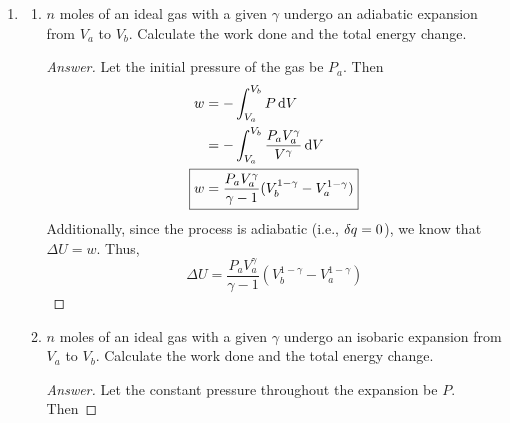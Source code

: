 \documentclass[../psets.tex]{subfiles}
\begin{document}
\begin{enumerate}
\begin{proof}[Answer]


    \end{proof}
    \item 
    \begin{enumerate}
        \item $n$ moles of an ideal gas with a given $\gamma$ undergo an adiabatic expansion from $V_a$ to $V_b$. Calculate the work done and the total energy change.
        \begin{proof}[Answer]
            Let the initial pressure of the gas be $P_a$. Then
            \begin{align*}
                w &= -\int_{V_a}^{V_b}P\dd{V}\\
                &= -\int_{V_a}^{V_b}\frac{P_aV_a^\gamma}{V^\gamma}\dd{V}\\
                \Aboxed{w &= \frac{P_aV_a^\gamma}{\gamma-1}(V_b^{1-\gamma}-V_a^{1-\gamma})}
            \end{align*}
            Additionally, since the process is adiabatic (i.e., $\var{q}=0$), we know that $\Delta U=w$. Thus,
            \begin{equation*}
                \boxed{\Delta U = \frac{P_aV_a^\gamma}{\gamma-1}(V_b^{1-\gamma}-V_a^{1-\gamma})}
            \end{equation*}
        \end{proof}
        \item $n$ moles of an ideal gas with a given $\gamma$ undergo an isobaric expansion from $V_a$ to $V_b$. Calculate the work done and the total energy change.
        \begin{proof}[Answer]
            Let the constant pressure throughout the expansion be $P$. Then

\end{proof}
\end{enumerate}
\end{enumerate}
\end{document}
